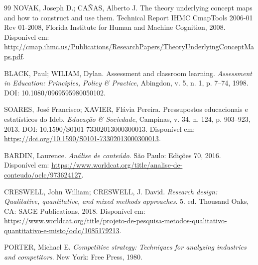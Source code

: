 \begin{thebibliography}{99}
NOVAK, Joseph D.; CAÑAS, Alberto J. The theory underlying concept maps and how to construct and use them. Technical Report IHMC CmapTools 2006-01 Rev 01-2008, Florida Institute for Human and Machine Cognition, 2008. Disponível em: \url{http://cmap.ihmc.us/Publications/ResearchPapers/TheoryUnderlyingConceptMaps.pdf}.


BLACK, Paul; WILIAM, Dylan. Assessment and classroom learning. \textit{Assessment in Education: Principles, Policy \& Practice}, Abingdon, v. 5, n. 1, p. 7--74, 1998. DOI: 10.1080/0969595980050102.

SOARES, José Francisco; XAVIER, Flávia Pereira. Pressupostos educacionais e estatísticos do Ideb. \textit{Educação \& Sociedade}, Campinas, v. 34, n. 124, p. 903--923, 2013. DOI: 10.1590/S0101-73302013000300013. Disponível em: \url{https://doi.org/10.1590/S0101-73302013000300013}.






BARDIN, Laurence. \textit{Análise de conteúdo}. São Paulo: Edições 70, 2016. Disponível em: \url{https://www.worldcat.org/title/analise-de-conteudo/oclc/973624127}.

CRESWELL, John William; CRESWELL, J. David. \textit{Research design: Qualitative, quantitative, and mixed methods approaches}. 5. ed. Thousand Oaks, CA: SAGE Publications, 2018. Disponível em: \url{https://www.worldcat.org/title/projeto-de-pesquisa-metodos-qualitativo-quantitativo-e-misto/oclc/1085179213}.


PORTER, Michael E. \textit{Competitive strategy: Techniques for analyzing industries and competitors}. New York: Free Press, 1980.



\end{thebibliography}
